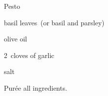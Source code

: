 \begin{recipe}{Pesto}{}{}

\begin{ingredients}
\item {} basil leaves~(or basil and parsley)
\item \C{\third} olive oil
\item \C{\quarter} 
\item 2~cloves of garlic
\item salt
\end{ingredients}

\begin{directions}
\item Purée all ingredients.
\end{directions}

\end{recipe}
